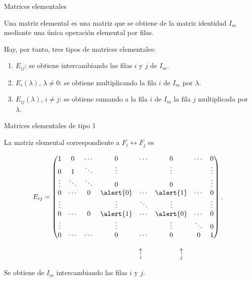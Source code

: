 \begin{frame}{Matrices elementales}

\begin{definition}
Una \alert{matriz elemental} es una matriz que se obtiene de la
matriz identidad \(I_m\) mediante una única operación elemental
por filas.
\end{definition}

\medskip

Hay, por tanto, tres tipos de matrices elementales:

\begin{enumerate}
    \item \(E_{ij}\): se obtiene intercambiando las filas \(i\) y \(j\)
    de \(I_m\).

    \item \(E_i(\lambda)\), \(\lambda\neq0\): se obtiene multiplicando
    la fila \(i\) de \(I_m\) por \(\lambda\).

    \item \(E_{ij}(\lambda)\), \(i\neq j\): se obtiene sumando a la
    fila \(i\) de \(I_m\) la fila \(j\) multiplicada por \(\lambda\).
\end{enumerate}

\end{frame}

\begin{frame}{Matrices elementales de tipo 1}

La matriz elemental correspondiente a
\(F_i\leftrightarrow F_j\) es

\[
E_{ij}=
\begin{pmatrix}
1      & 0      & \cdots & 0      & \cdots & 0      & \cdots & 0\\
0      & 1      & \ddots & \vdots &        & \vdots &        & \vdots\\
\vdots & \ddots & \ddots & 0      &        & 0      &        & \vdots\\
0      & \cdots & 0      & \alert{0} & \cdots & \alert{1} & \cdots & 0\\
\vdots &        &        & \vdots & \ddots & \vdots &        & \vdots\\
0      & \cdots & 0      & \alert{1} & \cdots & \alert{0} & \cdots & 0\\
\vdots &        &        & \vdots &        & \vdots & \ddots & 0\\
0      & \cdots & \cdots & 0      & \cdots & 0      & 0      & 1
\end{pmatrix}.
\]

\[
\hspace{34mm}
\underset{i}{\uparrow}
\hspace{19mm}
\underset{j}{\uparrow}
\]

Se obtiene de \(I_m\) intercambiando las filas \(i\) y \(j\).

\end{frame}

